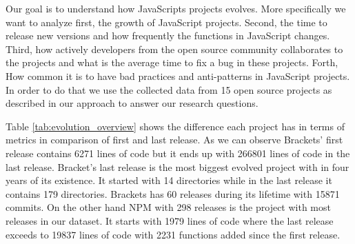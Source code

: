 Our goal is to understand how JavaScripts projects evolves. More specifically we want to analyze first, the growth of JavaScript projects. Second, the time to release new versions and how frequently the functions in JavaScript changes. Third, how actively developers from the open source community collaborates to the projects and what is the average time to fix a bug in these projects. Forth, How common it is to have bad practices and anti-patterns in JavaScript projects. In order to do that we use the collected data from 15 open source projects as described in our approach to answer our research questions. 

\vspace{5 mm}
\noindent{\rqi}
\vspace{5 mm}

Table \ref{tab:evolution_overview} shows the difference each project has in terms of metrics in comparison of first and last release.
As we can observe Brackets' first release contains 6271 lines of code but it ends up with 266801 lines of code in the last release. Bracket's last release is the most biggest evolved project with in four years of its existence. It started with 14 directories while in the last release it contains 179 directories. Brackets has 60 releases during its lifetime with 15871 commits. On the other hand NPM with 298 releases is the project with most releases in our dataset. It starts with 1979 lines of code where the last release exceeds to 19837 lines of code with 2231 functions added since the first release. 

